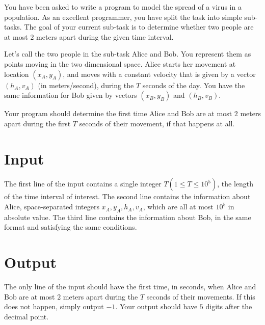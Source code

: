 You have been asked to write a program to model the spread of a virus in a population.
As an excellent programmer, you have split the task into simple sub-tasks.
The goal of your current sub-task is to determine whether two people are at most $2$ meters apart during the given time interval.

Let's call the two people in the sub-task Alice and Bob.
You represent them as points moving in the two dimensional space.
Alice starts her movement at location $(x_A, y_A)$, and moves with a constant velocity that is given by a vector $(h_A, v_A)$ (in meters/second), during the $T$ seconds of the day.
You have the same information for Bob given by vectors $(x_B, y_B)$ and $(h_B, v_B)$.

Your program should determine the first time Alice and Bob are at most $2$ meters apart during the first $T$ seconds of their movement, if that happens at all.
\section*{Input}
The first line of the input contains a single integer $T (1 \leq T \leq 10^5)$, the length of the time interval of interest.
The second line contains the information about Alice, space-separated integers $x_A, y_A, h_A, v_A$, which are all at most $10^5$ in absolute value.
The third line contains the information about Bob, in the same format and satisfying the same conditions.

\section*{Output}
The only line of the input should have the first time, in seconds, when Alice and Bob are at most $2$ meters apart during the $T$ seconds of their movements.
If this does not happen, simply output $-1$.
Your output should have $5$ digits after the decimal point.
